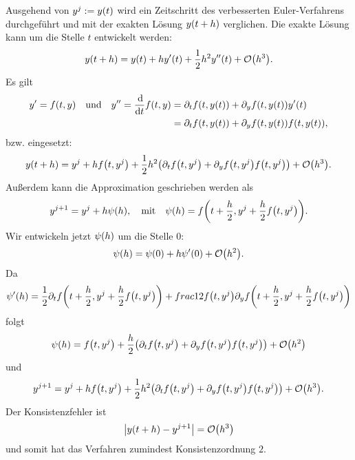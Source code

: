 \documentclass{exercise}
\begin{document}
	Ausgehend von \(y^j := y\parentheses*{t}\) wird ein Zeitschritt des verbesserten Euler-Verfahrens durchgeführt und mit der exakten Lösung \(y\parentheses*{t + h}\) verglichen.
	Die exakte Lösung kann um die Stelle \(t\) entwickelt werden:
	\[
		y\parentheses*{t + h} = y\parentheses*{t} + hy'\parentheses*{t} + \frac{1}{2}h^2 y''\parentheses*{t} + \mathcal{O}\parentheses*{h^3}.
	\]
	Es gilt
	\begin{align*}
		y' = f\parentheses*{t, y} \quad \text{und} \quad y'' = \frac{\d}{\d t}f\parentheses*{t, y} &= \partial_t f\parentheses*{t, y\parentheses*{t}} + \partial_y f\parentheses*{t, y\parentheses*{t}}y'\parentheses*{t}\\
		&= \partial_t f\parentheses*{t, y\parentheses*{t}} + \partial_y f\parentheses*{t, y\parentheses*{t}}f\parentheses*{t, y\parentheses*{t}},
	\end{align*}
	bzw. eingesetzt:
	\[
		y\parentheses*{t + h} = y^j + hf\parentheses*{t, y^j} + \frac{1}{2}h^2 \parentheses*{\partial_t f\parentheses*{t, y^j} + \partial_y f\parentheses*{t, y^j}f\parentheses*{t, y^j}} + \mathcal{O}\parentheses*{h^3}.
	\]
	Außerdem kann die Approximation geschrieben werden als
	\[
		y^{j + 1} = y^j + h\psi\parentheses*{h}, \quad \text{mit} \quad \psi\parentheses*{h} = f\parentheses*{t + \frac{h}{2}, y^j + \frac{h}{2}f\parentheses*{t, y^j}}.
	\]
	Wir entwickeln jetzt \(\psi\parentheses*{h}\) um die Stelle \(0\):
	\[
		\psi\parentheses*{h} = \psi\parentheses*{0} + h\psi'\parentheses*{0} + \mathcal{O}\parentheses*{h^2}.
	\]
	Da
	\[
		\psi'\parentheses*{h} = \frac{1}{2}\partial_t f\parentheses*{t + \frac{h}{2}, y^j + \frac{h}{2}f\parentheses*{t, y^j}} + frac{1}{2}f\parentheses*{t, y^j}\partial_y f\parentheses*{t + \frac{h}{2}, y^j + \frac{h}{2}f\parentheses*{t, y^j}}
	\]
	folgt
	\[
		\psi\parentheses*{h} = f\parentheses*{t, y^j} + \frac{h}{2}\parentheses*{\partial_t f\parentheses*{t, y^j} + \partial_y f\parentheses*{t, y^j}f\parentheses*{t, y^j}} + \mathcal{O}\parentheses*{h^2}
	\]
	und
	\[
		y^{j + 1} = y^j + hf\parentheses*{t, y^j} + \frac{1}{2}h^2 \parentheses*{\partial_t f\parentheses*{t, y^j} + \partial_y f\parentheses*{t, y^j}f\parentheses*{t, y^j}} + \mathcal{O}\parentheses*{h^3}.
	\]
	Der Konsistenzfehler ist
	\[
		\absolute*{y\parentheses*{t + h} - y^{j + 1}} = \mathcal{O}\parentheses*{h^3}
	\]
	und somit hat das Verfahren zumindest Konsistenzordnung \(2\).
\end{document}
